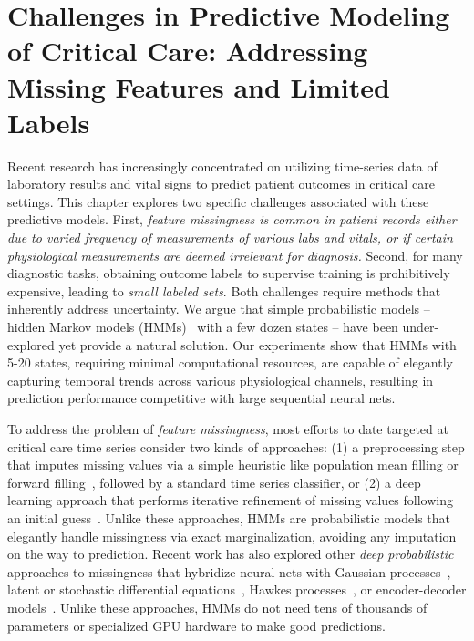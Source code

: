 \section{Challenges in Predictive Modeling of Critical Care: Addressing Missing Features and Limited Labels}
Recent research has increasingly concentrated on utilizing time-series data of laboratory results and vital signs to predict patient outcomes in critical care settings. This chapter explores two specific challenges associated with these predictive models.
First, \emph{feature missingness is common in patient records either due to varied frequency of measurements of various labs and vitals, or if certain physiological measurements are deemed irrelevant for diagnosis.}
Second, for many diagnostic tasks, obtaining outcome labels to supervise training is prohibitively expensive, leading to \emph{small labeled sets}.
Both challenges require methods that inherently address uncertainty.
We argue that simple probabilistic models -- hidden Markov models (HMMs)~\citep{rabinerIntroductionHiddenMarkov1986,ghahramaniIntroductionHiddenMarkov2001b} with a few dozen states -- have been under-explored yet provide a natural solution. Our experiments show that HMMs with 5-20 states, requiring minimal computational resources, are capable of elegantly capturing temporal trends across various physiological channels, resulting in prediction performance competitive with large sequential neural nets.

To address the problem of \emph{feature missingness}, most efforts to date targeted at critical care time series consider two kinds of approaches: (1) a preprocessing step that imputes missing values via a simple heuristic like population mean filling or forward filling~\citep{purushothamBenchmarkingDeepLearning2018,harutyunyanMultitaskLearningBenchmarking2019a, harvey2023comparative}, followed by a standard time series classifier, or (2) a deep learning approach that performs iterative refinement of missing values following an initial guess~\citep{cheRecurrentNeuralNetworks2018,yoonGAINMissingData2018,caoBRITSBidirectionalRecurrent2018}.
Unlike these approaches, HMMs are probabilistic models that elegantly handle missingness via exact marginalization, avoiding any imputation on the way to prediction.
Recent work has also explored other \emph{deep probabilistic} approaches to missingness that hybridize neural nets with Gaussian processes~\citep{futomaLearningDetectSepsis2017},
latent or stochastic differential equations~\citep{rubanovaLatentODEsIrregularlySampled2019,debrouwerGRUODEBayesContinuousModeling2019},
Hawkes processes~\citep{meiNeuralHawkesProcess2017},
 or encoder-decoder models~\citep{liLearningIrregularlySampledTime2020}.
Unlike these approaches, HMMs do not need tens of thousands of parameters or specialized GPU hardware to make good predictions. 

